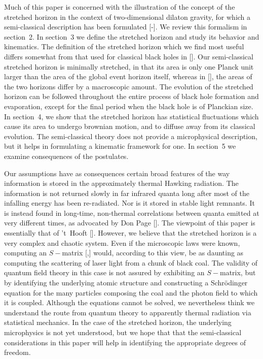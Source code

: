 Much of this paper is concerned with the illustration of the concept
of the stretched horizon in the context of two-dimensional dilaton
gravity, for which a semi-classical description has been formulated
[\CGHS-\lowe].  We review this formalism in section~2.  In section~3
we define the stretched horizon and study its behavior and
kinematics.  The definition of the stretched horizon which we find
most useful differs somewhat from that used for classical black holes
in [\Mempar].  Our semi-classical stretched horizon is minimally
stretched, in that its area is only one Planck unit larger than the
area of the global event horizon itself, whereas in [\Mempar], the
areas of the two horizons differ by a macroscopic amount.  The
evolution of the stretched horizon can be followed throughout the
entire process of black hole formation and evaporation, except for
the final period when the black hole is of Planckian size.  In
section~4, we show that the stretched horizon has statistical
fluctuations which cause its area to undergo brownian motion, and to
diffuse away from its classical evolution.  The semi-classical theory
does not provide a microphysical description, but it helps in
formulating a kinematic framework for one.  In section~5 we examine
consequences of the postulates.

Our assumptions have as consequences certain broad features of the
way information is stored in the approximately thermal Hawking
radiation.  The information is not returned slowly in far infrared
quanta long after most of the infalling energy has been re-radiated.
Nor is it stored in stable light remnants.  It is instead found in
long-time, non-thermal correlations between quanta emitted at very
different times, as advocated by Don Page [\page].  The viewpoint of
this paper is essentially that of 't~Hooft [\tHooftone].  However, we
believe that the stretched horizon is a very complex and chaotic
system.  Even if the microscopic laws were known, computing an
$S-$matrix [\tHooftone,\svv] would, according to this view, be as
daunting as computing the scattering of laser light from a chunk of
black coal.  The validity of quantum field theory in this case is not
assured by exhibiting an $S-$matrix, but by identifying the
underlying atomic structure and constructing a Schr\"odinger equation
for the many particles composing the coal and the photon field to
which it is coupled.  Although the equations cannot be solved, we
nevertheless think we understand the route from quantum theory to
apparently thermal radiation via statistical mechanics.  In the case
of the stretched horizon, the underlying microphysics is not yet
understood, but we hope that that the semi-classical considerations
in this paper will help in identifying the appropriate degrees of
freedom.

